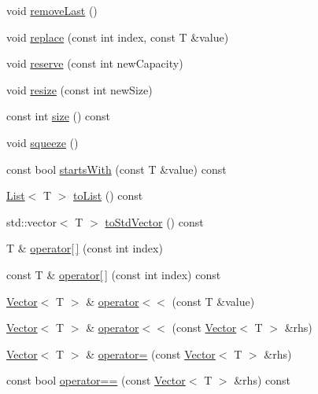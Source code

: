 \begin{DoxyCompactItemize}
\item 
void \hyperlink{classprism_1_1_vector_a0d2d2724f9ba5a520159ddce1c9b4681}{remove\+Last} ()
\item 
void \hyperlink{classprism_1_1_vector_a6efd18c9c21f2a98f59ccea0ae2b694c}{replace} (const int index, const T \&value)
\item 
void \hyperlink{classprism_1_1_vector_a617fa4a86aca478131d33984c01118ae}{reserve} (const int new\+Capacity)
\item 
void \hyperlink{classprism_1_1_vector_a13675c55c77df670075a9f80057d1d2e}{resize} (const int new\+Size)
\item 
const int \hyperlink{classprism_1_1_vector_ac6ff3296683e76da61d48bcc15e4f175}{size} () const 
\item 
void \hyperlink{classprism_1_1_vector_ab2491ac6ff73d372ed8f080adef78208}{squeeze} ()
\item 
const bool \hyperlink{classprism_1_1_vector_a7562a7e62555ee5cc35b309799cbfb05}{starts\+With} (const T \&value) const 
\item 
\hyperlink{classprism_1_1_list}{List}$<$ T $>$ \hyperlink{classprism_1_1_vector_a68d7d3001dae3b1e129d91ff4ae9cee2}{to\+List} () const 
\item 
std\+::vector$<$ T $>$ \hyperlink{classprism_1_1_vector_a68169a16de2e15abd953b32596b624ed}{to\+Std\+Vector} () const 
\item 
T \& \hyperlink{classprism_1_1_vector_a69fd5a988b3d3e84dc3101005132325e}{operator\mbox{[}$\,$\mbox{]}} (const int index)
\item 
const T \& \hyperlink{classprism_1_1_vector_ab972f2215f8445680cccbb4fb0213f09}{operator\mbox{[}$\,$\mbox{]}} (const int index) const 
\item 
\hyperlink{classprism_1_1_vector}{Vector}$<$ T $>$ \& \hyperlink{classprism_1_1_vector_a62b0ab43dac0b584544a891d49f70782}{operator$<$$<$} (const T \&value)
\item 
\hyperlink{classprism_1_1_vector}{Vector}$<$ T $>$ \& \hyperlink{classprism_1_1_vector_aa6a73a282c4063eced2a40a2568f69ac}{operator$<$$<$} (const \hyperlink{classprism_1_1_vector}{Vector}$<$ T $>$ \&rhs)
\item 
\hyperlink{classprism_1_1_vector}{Vector}$<$ T $>$ \& \hyperlink{classprism_1_1_vector_a92c45e84dffbaf105538785bbb71aa94}{operator=} (const \hyperlink{classprism_1_1_vector}{Vector}$<$ T $>$ \&rhs)
\item 
const bool \hyperlink{classprism_1_1_vector_aedbb9a32bb25fe4bc5907fa498fe6534}{operator==} (const \hyperlink{classprism_1_1_vector}{Vector}$<$ T $>$ \&rhs) const 

\end{DoxyCompactItemize}
